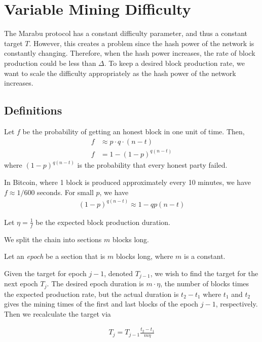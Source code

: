 \section{Variable Mining Difficulty}
The Marabu protocol has a constant difficulty parameter, and thus a constant target $T$. However, this creates a problem since the hash power of the network is constantly changing. Therefore, when the hash power increases, the rate of block production could be less than $\Delta$. To keep a desired block production rate, we want to scale the difficulty appropriately as the hash power of the network increases.

\subsection{Definitions}

\begin{definition}
    Let $f$ be the probability of getting an honest block in one unit of time. Then,
\begin{align*}
    f &\approx p \cdot q \cdot (n-t) \\
    f &= 1- (1-p)^{q(n-t)}
\end{align*}
where $(1-p)^{q(n-t)}$ is the probability that every honest party failed.
\end{definition}
In Bitcoin, where 1 block is produced approximately every 10 minutes, we have $f \approx 1/600$ seconds. For small $p$, we have
\begin{align*}
    (1-p)^{q(n-t)} \approx 1 - qp(n-t)
\end{align*}

\begin{definition}
Let $\eta = \frac{1}{f}$ be the expected block production duration.
\end{definition}
We split the chain into sections $m$ blocks long.
\begin{definition}
Let an \textit{epoch} be a section that is $m$ blocks long, where $m$ is a constant.
\end{definition}
Given the target for epoch $j-1$, denoted $T_{j-1}$, we wish to find the target for the next epoch $T_j$. The desired epoch duration is $m\cdot \eta$, the number of blocks times the expected production rate, but the actual duration is $t_2-t_1$ where $t_1$ and $t_2$ gives the mining times of the first and last blocks of the epoch $j-1$, respectively. Then we recalculate the target via

\begin{align*}
    T_j = T_{j-1}\frac{t_2 - t_1}{m\eta}
\end{align*}

